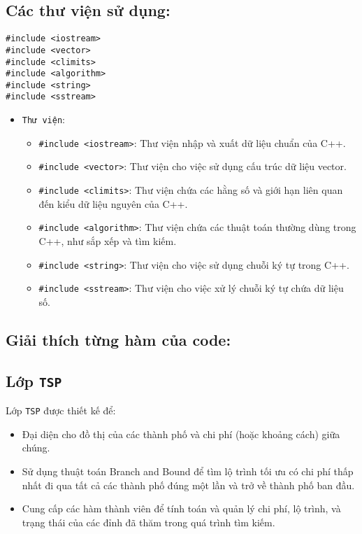 \documentclass[a4paper]{article}
\begin{document}
\subsection{Các thư viện sử dụng: }\label{control}

\begin{lstlisting}[style=cppstyle]
#include <iostream>
#include <vector>
#include <climits>
#include <algorithm>
#include <string>
#include <sstream>
\end{lstlisting}
\begin{itemize}
\item \texttt{Thư viện}:
\begin{itemize}
    \item \texttt{\#include <iostream>}: Thư viện nhập và xuất dữ liệu chuẩn của C++.
    \item \texttt{\#include <vector>}: Thư viện cho việc sử dụng cấu trúc dữ liệu vector.
    \item \texttt{\#include <climits>}: Thư viện chứa các hằng số và giới hạn liên quan đến kiểu dữ liệu nguyên của C++.
    \item \texttt{\#include <algorithm>}: Thư viện chứa các thuật toán thường dùng trong C++, như sắp xếp và tìm kiếm.
    \item \texttt{\#include <string>}: Thư viện cho việc sử dụng chuỗi ký tự trong C++.
    \item \texttt{\#include <sstream>}: Thư viện cho việc xử lý chuỗi ký tự chứa dữ liệu số.
\end{itemize}
\end{itemize}

\subsection{Giải thích từng hàm của code: }\label{control}
\subsection*{Lớp \texttt{TSP}}
Lớp \texttt{TSP} được thiết kế để:
\begin{itemize}
    \item Đại diện cho đồ thị của các thành phố và chi phí (hoặc khoảng cách) giữa chúng.
    \item Sử dụng thuật toán Branch and Bound để tìm lộ trình tối ưu có chi phí thấp nhất đi qua tất cả các thành phố đúng một lần và trở về thành phố ban đầu.
    \item Cung cấp các hàm thành viên để tính toán và quản lý chi phí, lộ trình, và trạng thái của các đỉnh đã thăm trong quá trình tìm kiếm.
\end{itemize}
\end{document}
